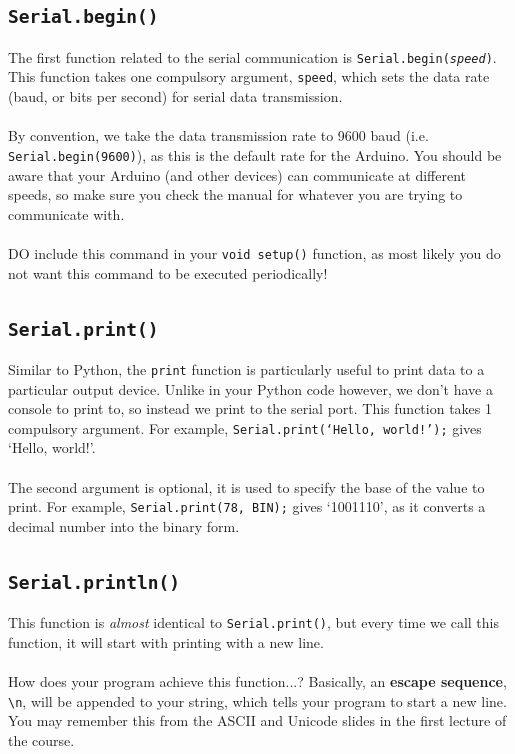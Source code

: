 \documentclass{article}
\begin{document}
\subsection{\texttt{Serial.begin()}}
The first function related to the serial communication is \texttt{Serial.begin(\textit{speed})}. This function takes one compulsory argument, \texttt{speed}, which sets the data rate (baud, or bits per second) for serial data transmission. \\\\ By convention, we take the data transmission rate to 9600 baud (i.e. \texttt{Serial.begin(9600)}), as this is the default rate for the Arduino. You should be aware that your Arduino (and other devices) can communicate at different speeds, so make sure you check the manual for whatever you are trying to communicate with.\\\\DO include this command in your \texttt{void setup()} function, as most likely you do not want this command to be executed periodically!

\subsection{\texttt{Serial.print()}}
Similar to Python, the \texttt{print} function is particularly useful to print data to a particular output device. Unlike in your Python code however, we don't have a console to print to, so instead we print to the serial port. This function takes 1 compulsory argument. For example, \texttt{Serial.print(`Hello, world!');} gives `Hello, world!'. \\\\The second argument is optional, it is used to specify the base of the value to print. For example, \texttt{Serial.print(78, BIN);} gives `1001110', as it converts a decimal number into the binary form.

\subsection{\texttt{Serial.println()}}
This function is \textit{almost} identical to \texttt{Serial.print()}, but every time we call this function, it will start with printing with a new line.\\\\How does your program achieve this function...? Basically, an \textbf{escape sequence}, {\texttt{\Large\textbackslash n}}, will be appended to your string, which tells your program to start a new line. You may remember this from the ASCII and Unicode slides in the first lecture of the course.
\end{document}
